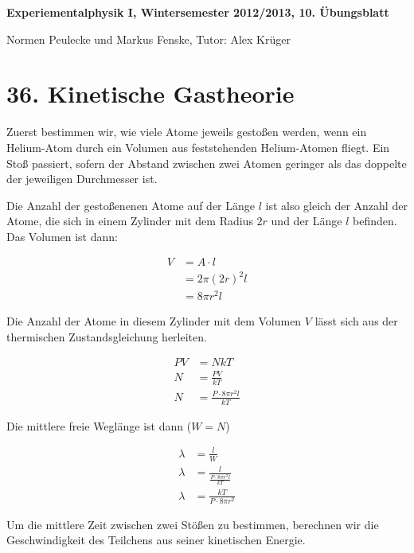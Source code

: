 \documentclass[a4paper,german,12pt,smallheadings]{scrartcl}
\begin{document}
\begin{center}
\bfseries %
\sffamily %
\vspace{-40pt}
Experiementalphysik I, Wintersemester 2012/2013, 10. Übungsblatt

Normen Peulecke und Markus Fenske, Tutor: Alex Krüger
\vspace{-10pt}
\end{center}

\section*{36. Kinetische Gastheorie}

Zuerst bestimmen wir, wie viele Atome jeweils gestoßen werden, wenn ein
Helium-Atom durch ein Volumen aus feststehenden Helium-Atomen fliegt. Ein Stoß
passiert, sofern der Abstand zwischen zwei Atomen geringer als das doppelte der
jeweiligen Durchmesser ist.

Die Anzahl der gestoßenenen Atome auf der Länge $l$ ist also gleich der Anzahl der Atome, die
sich in einem Zylinder mit dem Radius $2r$ und der Länge $l$ befinden. Das Volumen ist dann:

\begin{align*}
  V &= A \cdot l \\
    &= 2\pi(2r)^2 l \\
    &= 8\pi r^2 l
\end{align*}

Die Anzahl der Atome in diesem Zylinder mit dem Volumen $V$ lässt sich aus der
thermischen Zustandsgleichung herleiten.

\begin{align*}
  PV &= NkT \\
  N &= \frac{PV}{kT} \\
  N &= \frac{P \cdot 8 \pi r^2 l}{kT}
\end{align*}

Die mittlere freie Weglänge ist dann ($W = N$)

\begin{align*}
  \lambda &= \frac{l}{W} \\
  \lambda &= \frac{l}{\frac{P \cdot 8 \pi r^2 l}{kT}} \\
  \lambda &= \frac{kT}{P \cdot 8 \pi r^2}
\end{align*}

Um die mittlere Zeit zwischen zwei Stößen zu bestimmen, berechnen wir die Geschwindigkeit des Teilchens aus seiner kinetischen Energie.
\end{document}
